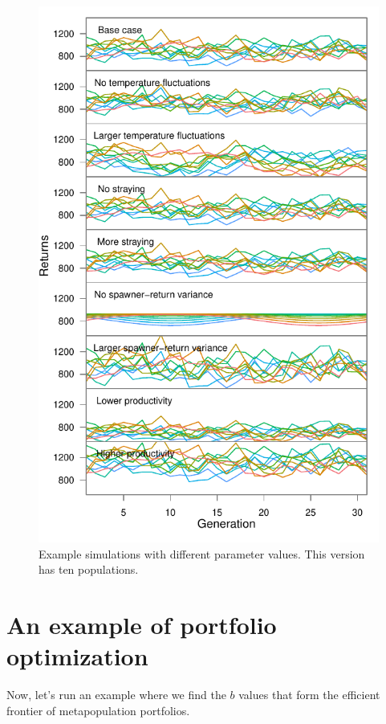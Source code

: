 \documentclass[12pt]{article}
\begin{document}
\begin{figure}[htbp]
\centering
\includegraphics{figure/plot-various-options-ts.pdf}
\caption{Example simulations with different parameter values. This
version has ten populations.\label{fig:sim-param-ts-10}}
\end{figure}

\clearpage

\section{An example of portfolio optimization}

Now, let's run an example where we find the $b$ values that form the
efficient frontier of metapopulation portfolios.
\end{document}
